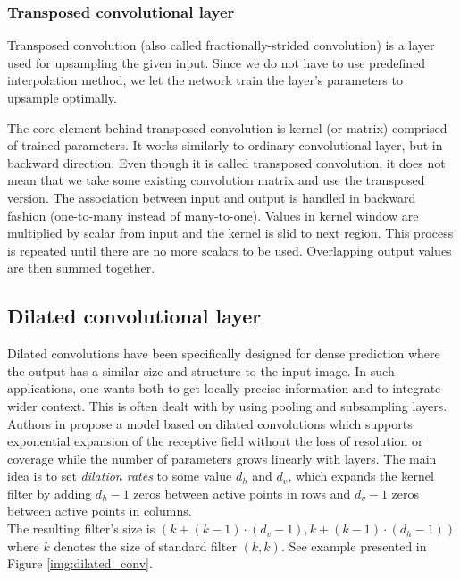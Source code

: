 \subsubsection{Transposed convolutional layer}
\label{sec:cnn:upsampling_layers:deconv_layer}

Transposed convolution (also called fractionally-strided convolution)
is a layer used for upsampling the given input. Since we do not have to use predefined
interpolation method, we let the network train the layer's parameters to upsample optimally.

The core element behind transposed convolution is kernel (or matrix) comprised of
trained parameters. It works similarly to ordinary convolutional layer, but in backward
direction. Even though it is called transposed convolution,
it does not mean that we take some existing convolution matrix and
use the transposed version. The association between input and output is handled in backward
fashion (one-to-many instead of many-to-one).
Values in kernel window are multiplied by scalar from input
and the kernel is slid to next region. This process is repeated until there are no more
scalars to be used. Overlapping output values are then summed together.

\subsection{Dilated convolutional layer}
\label{sec:cnn:dilated_layer}

Dilated convolutions have been specifically designed for dense prediction where
the output has a similar size and structure to the input image. In such applications,
one wants both to get locally precise information and to integrate wider context. 
This is often dealt with by using pooling and subsampling layers.
Authors in \cite{bib:yu2015multi} propose a model based on dilated convolutions which
supports exponential expansion of the receptive field without the loss of resolution or coverage
while the number of parameters grows linearly with layers.
The main idea is to set \textit{dilation rates} to some value $d_h$
and $d_v$, which expands the kernel
filter by adding $d_h-1$ zeros between active points in rows and $d_v-1$ zeros between
active points in columns.\\ The resulting filter's size is
$(k+(k-1)\cdot (d_v-1), k+(k-1)\cdot (d_h-1))$ where $k$ denotes the size of standard
filter $(k, k)$. See example presented in Figure \ref{img:dilated_conv}.

